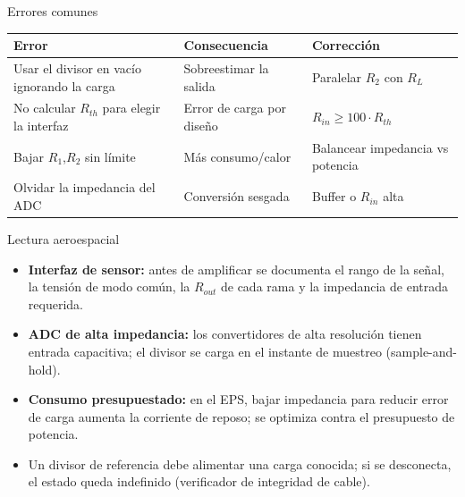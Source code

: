 \documentclass[aspectratio=169]{beamer}
\begin{document}
  \begin{frame}{Errores comunes}
  \begin{table}
    \small
    \begin{tabular}{p{}p{}p{}}
      \toprule
      Error & Consecuencia & Corrección \\
      \midrule
      Usar el divisor en vacío ignorando la carga & Sobreestimar la salida & Paralelar $R_2$ con $R_L$ \\
      No calcular $R_{th}$ para elegir la interfaz & Error de carga por diseño & $R_{in} \ge 100\cdot R_{th}$ \\
      Bajar $R_1$,$R_2$ sin límite & Más consumo/calor & Balancear impedancia vs potencia \\
      Olvidar la impedancia del ADC & Conversión sesgada & Buffer o $R_{in}$ alta \\
      \bottomrule
    \end{tabular}
  \end{table}
\end{frame}

\begin{frame}{Lectura aeroespacial}
  \begin{itemize}
    \item \textbf{Interfaz de sensor:} antes de amplificar se documenta el rango de la señal,
      la tensión de modo común, la $R_{out}$ de cada rama y la impedancia de entrada requerida.
    \item \textbf{ADC de alta impedancia:} los convertidores de alta resolución tienen entrada
      capacitiva; el divisor se carga en el instante de muestreo (sample-and-hold).
    \item \textbf{Consumo presupuestado:} en el EPS, bajar impedancia para reducir error de carga
      aumenta la corriente de reposo; se optimiza contra el presupuesto de potencia.
    \item Un divisor de referencia debe alimentar una carga conocida; si se desconecta, el
      estado queda indefinido (verificador de integridad de cable).
  \end{itemize}
\end{frame}
\end{document}
